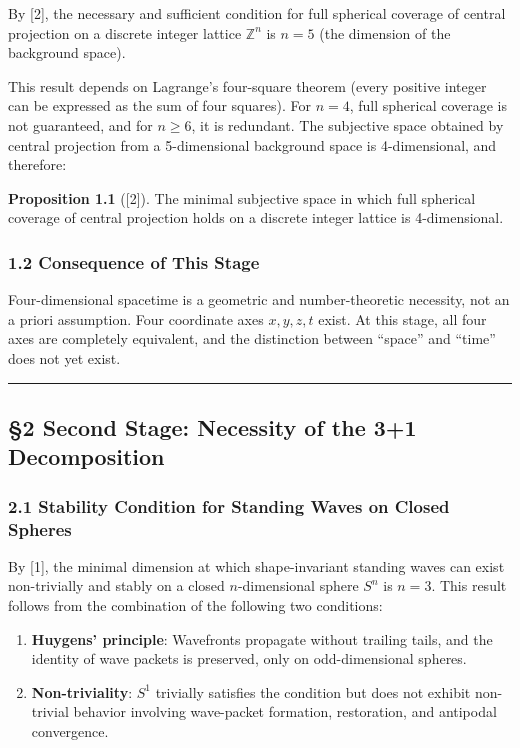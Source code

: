 \documentclass[
  a4paper,11pt]{article}
\begin{document}
By {[}2{]}, the necessary and sufficient condition for full spherical
coverage of central projection on a discrete integer lattice
\(\mathbb{Z}^n\) is \(n = 5\) (the dimension of the background space).

This result depends on Lagrange's four-square theorem (every positive
integer can be expressed as the sum of four squares). For \(n = 4\),
full spherical coverage is not guaranteed, and for \(n \geq 6\), it is
redundant. The subjective space obtained by central projection from a
5-dimensional background space is 4-dimensional, and therefore:

\textbf{Proposition 1.1} ({[}2{]}). The minimal subjective space in
which full spherical coverage of central projection holds on a discrete
integer lattice is 4-dimensional.

\subsubsection{1.2 Consequence of This
Stage}\label{consequence-of-this-stage}

Four-dimensional spacetime is a geometric and number-theoretic
necessity, not an a priori assumption. Four coordinate axes
\(x, y, z, t\) exist. At this stage, all four axes are completely
equivalent, and the distinction between ``space'' and ``time'' does not
yet exist.

\begin{center}\rule{0.5\linewidth}{0.5pt}\end{center}

\subsection{§2 Second Stage: Necessity of the 3+1
Decomposition}\label{second-stage-necessity-of-the-31-decomposition}

\subsubsection{2.1 Stability Condition for Standing Waves on Closed
Spheres}\label{stability-condition-for-standing-waves-on-closed-spheres}

By {[}1{]}, the minimal dimension at which shape-invariant standing
waves can exist non-trivially and stably on a closed \(n\)-dimensional
sphere \(S^n\) is \(n = 3\). This result follows from the combination of
the following two conditions:

\begin{enumerate}
\def\labelenumi{(\roman{enumi})}
\item
  \textbf{Huygens' principle}: Wavefronts propagate without trailing
  tails, and the identity of wave packets is preserved, only on
  odd-dimensional spheres.
\item
  \textbf{Non-triviality}: \(S^1\) trivially satisfies the condition but
  does not exhibit non-trivial behavior involving wave-packet formation,
  restoration, and antipodal convergence.
\end{enumerate}
\end{document}
